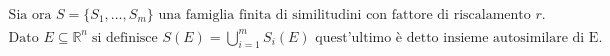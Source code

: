 \documentclass[preview]{standalone}
\begin{document}
\begin{align*}
\text{Sia ora }S = \{S_1, \dots, S_m\} \text{ una famiglia finita di similitudini con fattore di riscalamento } r.\\ \text{Dato } E \subseteq \mathbb{R}^n \;\text{si definisce } S(E) = \bigcup_{i=1}^m S_i(E) \text{ quest'ultimo è detto insieme autosimilare di E.}
\end{align*}
\end{document}
